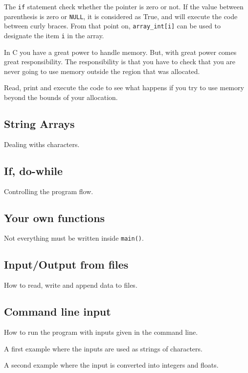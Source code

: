 \documentclass{article}
\begin{document}
The \verb"if" statement check whether the pointer is zero or not. If the value between parenthesis is zero or \verb"NULL", it is considered as True, and will execute the code between curly braces. From that point on, \verb"array_int[i]" can be used to designate the item \verb"i" in the array.

In C you have a great power to handle memory. But, with great power comes great responsibility. The responsibility is that you have to check that you are never going to use memory outside the region that was allocated.

Read, print and execute the code to see what happens if you try to use memory beyond the bounds of your allocation.

\subsection{String Arrays}
Dealing withs characters.


\subsection{If, do-while}
Controlling the program flow.


\subsection{Your own functions}
Not everything must be written inside \verb"main()".


\subsection{Input/Output from files}
How to read, write and append data to files.


\subsection{Command line input}
How to run the program with inputs given in the command line.

A first example where the inputs are used as strings of characters.


A second example where the input is converted into integers and floats.

\end{document}
